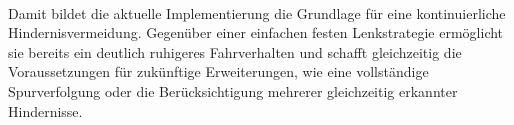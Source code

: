 \\
Damit bildet die aktuelle Implementierung die Grundlage für eine kontinuierliche Hindernisvermeidung. Gegenüber einer einfachen festen Lenkstrategie ermöglicht sie bereits ein deutlich ruhigeres Fahrverhalten und schafft gleichzeitig die Voraussetzungen für zukünftige Erweiterungen, wie eine vollständige Spurverfolgung oder die Berücksichtigung mehrerer gleichzeitig erkannter Hindernisse.


